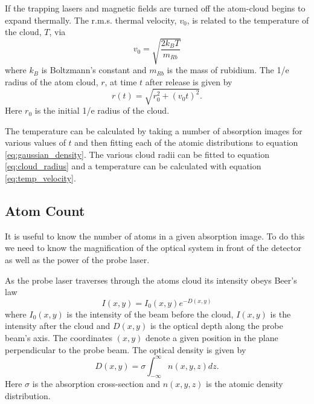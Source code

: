 If the trapping lasers and magnetic fields are turned off the atom-cloud begins to expand thermally. The r.m.s. thermal velocity, $v_0$, is related to the temperature of the cloud, $T$, via \cite{sheludko_shaped_2010}
\begin{equation}\label{eq:temp_velocity}
v_0 = \sqrt{\frac{2k_BT}{m_{Rb}}}
\end{equation}
where $k_B$ is Boltzmann's constant and $m_{Rb}$ is the mass of rubidium. The 1/e radius of the atom cloud, $r$, at time $t$ after release is given by
\begin{equation}\label{eq:cloud_radius}
r(t) = \sqrt{r_0^2 + (v_0t)^2}.
\end{equation}
Here $r_0$ is the initial 1/e radius of the cloud.

The temperature can be calculated by taking a number of absorption images for various values of $t$ and then fitting each of the atomic distributions to equation \ref{eq:gaussian_density}. The various cloud radii can be fitted to equation \ref{eq:cloud_radius} and a temperature can be calculated with equation \ref{eq:temp_velocity}.

\subsection{Atom Count}
\label{atom_count}

It is useful to know the number of atoms in a given absorption image. To do this we need to know the magnification of the optical system in front of the detector as well as the power of the probe laser.

As the probe laser traverses through the atoms cloud its intensity obeys Beer's law\cite{foot_atomic_2005}
\begin{equation}\label{eq:beers_law}
I(x, y) = I_0(x, y)e^{-D(x, y)}
\end{equation}
where $I_0(x, y)$ is the intensity of the beam before the cloud, $I(x, y)$ is the intensity after the cloud and $D(x, y)$ is the optical depth along the probe beam's axis. The coordinates $(x, y)$ denote a given position in the plane perpendicular to the probe beam. The optical density is given by
\begin{equation}\label{eq:optical_density}
D(x, y) = \sigma \int_{-\infty}^{\infty}n(x, y, z)dz.
\end{equation}
Here $\sigma$ is the absorption cross-section and $n(x, y, z)$ is the atomic density distribution.

